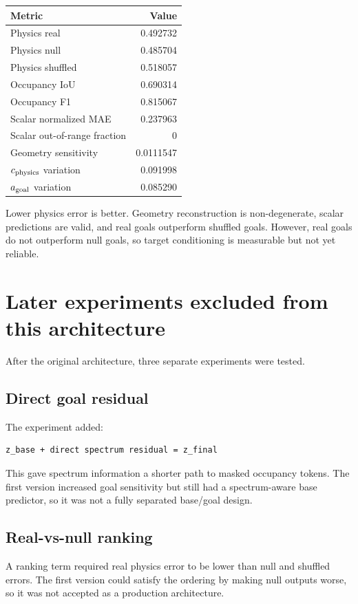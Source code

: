 \documentclass[11pt,a4paper]{article}
\begin{document}
\begin{center}
\begin{tabular}{lr}
\toprule
Metric & Value \\
\midrule
Physics real & 0.492732 \\
Physics null & 0.485704 \\
Physics shuffled & 0.518057 \\
Occupancy IoU & 0.690314 \\
Occupancy F1 & 0.815067 \\
Scalar normalized MAE & 0.237963 \\
Scalar out-of-range fraction & 0 \\
Geometry sensitivity & 0.0111547 \\
$c_{\rm physics}$ variation & 0.091998 \\
$a_{\rm goal}$ variation & 0.085290 \\
\bottomrule
\end{tabular}
\end{center}

Lower physics error is better. Geometry reconstruction is non-degenerate,
scalar predictions are valid, and real goals outperform shuffled goals.
However, real goals do not outperform null goals, so target conditioning is
measurable but not yet reliable.

\section{Later experiments excluded from this architecture}
After the original architecture, three separate experiments were tested.

\subsection{Direct goal residual}
The experiment added:
\begin{lstlisting}
z_base + direct spectrum residual = z_final
\end{lstlisting}
This gave spectrum information a shorter path to masked occupancy tokens. The
first version increased goal sensitivity but still had a spectrum-aware base
predictor, so it was not a fully separated base/goal design.

\subsection{Real-vs-null ranking}
A ranking term required real physics error to be lower than null and shuffled
errors. The first version could satisfy the ordering by making null outputs
worse, so it was not accepted as a production architecture.
\end{document}
